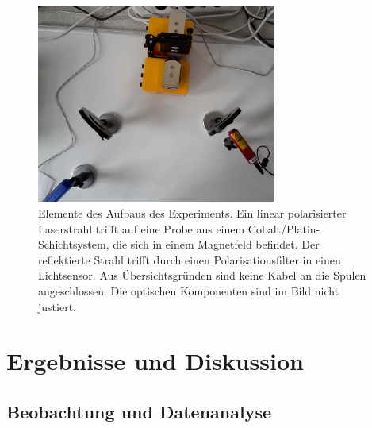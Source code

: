 \documentclass[
	a4paper,
	12pt,
	pagesize,
	ngerman
]{scrartcl}
\begin{document}
	\begin{figure}[H] 
		\includegraphics[width=0.7\textwidth]{O4_Aufbau} %
		\centering
		\caption{Elemente des Aufbaus des Experiments. Ein linear polarisierter Laserstrahl trifft auf eine Probe aus einem Cobalt/Platin-Schichtsystem, die sich in einem Magnetfeld befindet. Der reflektierte Strahl trifft durch einen Polarisationsfilter in einen Lichtsensor. Aus Übersichtsgründen sind keine Kabel an die Spulen angeschlossen. Die optischen Komponenten sind im Bild nicht justiert.} 
		\label{fig_aufbau}
		\centering
	\end{figure}
	
	\section{Ergebnisse und Diskussion}
	

	\subsection{Beobachtung und Datenanalyse}
\end{document}
